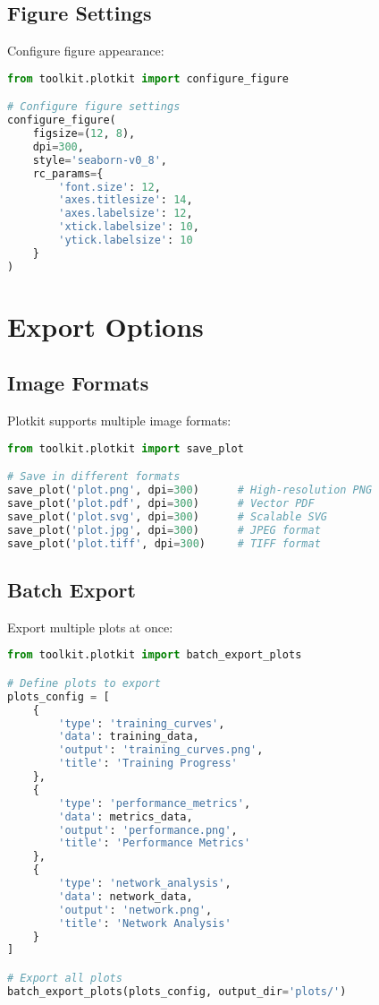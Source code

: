 \subsection{Figure Settings}

Configure figure appearance:

\begin{lstlisting}[language=python, caption=Figure Configuration]
from toolkit.plotkit import configure_figure

# Configure figure settings
configure_figure(
    figsize=(12, 8),
    dpi=300,
    style='seaborn-v0_8',
    rc_params={
        'font.size': 12,
        'axes.titlesize': 14,
        'axes.labelsize': 12,
        'xtick.labelsize': 10,
        'ytick.labelsize': 10
    }
)
\end{lstlisting}

\section{Export Options}

\subsection{Image Formats}

Plotkit supports multiple image formats:

\begin{lstlisting}[language=python, caption=Export Formats]
from toolkit.plotkit import save_plot

# Save in different formats
save_plot('plot.png', dpi=300)      # High-resolution PNG
save_plot('plot.pdf', dpi=300)      # Vector PDF
save_plot('plot.svg', dpi=300)      # Scalable SVG
save_plot('plot.jpg', dpi=300)      # JPEG format
save_plot('plot.tiff', dpi=300)     # TIFF format
\end{lstlisting}

\subsection{Batch Export}

Export multiple plots at once:

\begin{lstlisting}[language=python, caption=Batch Export]
from toolkit.plotkit import batch_export_plots

# Define plots to export
plots_config = [
    {
        'type': 'training_curves',
        'data': training_data,
        'output': 'training_curves.png',
        'title': 'Training Progress'
    },
    {
        'type': 'performance_metrics',
        'data': metrics_data,
        'output': 'performance.png',
        'title': 'Performance Metrics'
    },
    {
        'type': 'network_analysis',
        'data': network_data,
        'output': 'network.png',
        'title': 'Network Analysis'
    }
]

# Export all plots
batch_export_plots(plots_config, output_dir='plots/')
\end{lstlisting}

